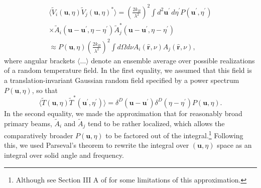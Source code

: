 \documentclass[twocolumn,apj,numberedappendix]{emulateapj}
\newcommand{\rhat}{\hat{\mathbf{r}}}
\begin{document}
\begin{eqnarray}
\label{eq:visCrossCorr}
\langle \widetilde{V}_i(\mathbf{u},\eta) \widetilde{V}_j(\mathbf{u},\eta)^*\rangle = \left( \frac{2 k_B}{\lambda^2} \right)^2 \int d^2 \mathbf{u}^\prime \, d\eta^\prime  P(\mathbf{u}^\prime , \eta^\prime) \nonumber \\
\times \widetilde{A}_i (\mathbf{u} -\mathbf{u}^\prime, \eta-\eta^\prime) \widetilde{A}_j^* (\mathbf{u} -\mathbf{u}^\prime, \eta-\eta^\prime) \nonumber \\
\approx P(\mathbf{u} , \eta) \left( \frac{2 k_B}{\lambda^2} \right)^2 \int d\Omega d\nu A_i (\rhat,\nu) A_j (\rhat,\nu), \quad
\end{eqnarray}
where angular brackets $\langle \dots \rangle$ denote an ensemble average over possible realizations of a random temperature field. In the first equality, we assumed that this field is a translation-invariant Gaussian random field specified by a power spectrum $P(\mathbf{u}, \eta)$, so that
\begin{equation}
\langle \widetilde{T}(\mathbf{u} , \eta) \widetilde{T}^*(\mathbf{u}^\prime , \eta^\prime)\rangle = \delta^{D} (\mathbf{u} - \mathbf{u}^\prime) \delta^D (\eta - \eta^\prime) P(\mathbf{u}, \eta).
\end{equation}
In the second equality, we made the approximation that for reasonably broad primary beams, $\widetilde{A}_i $ and $\widetilde{A}_j$ tend to be rather localized, which allows the comparatively broader $P(\mathbf{u}, \eta)$ to be factored out of the integral.\footnote{Although see Section III A of \citet{liu_et_al2014b} for some limitations of this approximation.} Following this, we used Parseval's theorem to rewrite the integral over $(\mathbf{u},\eta)$ space as an integral over solid angle and frequency.
\end{document}
